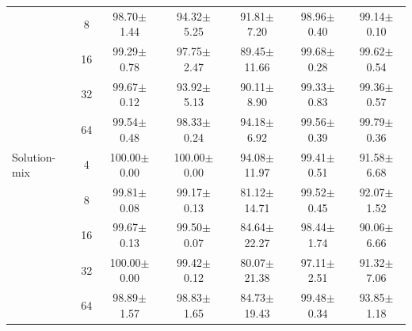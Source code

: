 \documentclass{article}
\theoremstyle{plain}
\theoremstyle{definition}
\theoremstyle{remark}
\begin{document}
\begin{table}[h!]
{\begin{tabular}{@{}lcccccc@{}}
 & 8 & 98.70$\pm$1.44 & 94.32$\pm$5.25 & 91.81$\pm$7.20 & 98.96$\pm$0.40 & 99.14$\pm$0.10 \\
 & 16 & 99.29$\pm$0.78 & 97.75$\pm$2.47 & 89.45$\pm$11.66 & 99.68$\pm$0.28 & 99.62$\pm$0.54 \\
 & 32 & 99.67$\pm$0.12 & 93.92$\pm$5.13 & 90.11$\pm$8.90 & 99.33$\pm$0.83 & 99.36$\pm$0.57 \\
 & 64 & 99.54$\pm$0.48 & 98.33$\pm$0.24 & 94.18$\pm$6.92 & 99.56$\pm$0.39 & 99.79$\pm$0.36 \\ \hline
Solution-mix & 4 & 100.00$\pm$0.00 & 100.00$\pm$0.00 & 94.08$\pm$11.97 & 99.41$\pm$0.51 & 91.58$\pm$6.68 \\
 & 8 & 99.81$\pm$0.08 & 99.17$\pm$0.13 & 81.12$\pm$14.71 & 99.52$\pm$0.45 & 92.07$\pm$1.52 \\
 & 16 & 99.67$\pm$0.13 & 99.50$\pm$0.07 & 84.64$\pm$22.27 & 98.44$\pm$1.74 & 90.06$\pm$6.66 \\
 & 32 & 100.00$\pm$0.00 & 99.42$\pm$0.12 & 80.07$\pm$21.38 & 97.11$\pm$2.51 & 91.32$\pm$7.06 \\
 & 64 & 98.89$\pm$1.57 & 98.83$\pm$1.65 & 84.73$\pm$19.43 & 99.48$\pm$0.34 & 93.85$\pm$1.18 \\ \bottomrule
\end{tabular}}
\end{table}
\end{document}
